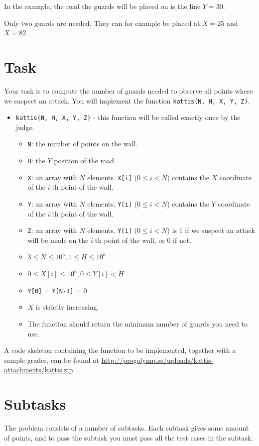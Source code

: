 In the example, the road the guards will be placed on is the line $Y = 30$.

Only two guards are needed. They can for example be placed at $X = 25$ and $X = 82$.

\section*{Task}
Your task is to compute the number of guards needed to observe all points where we suspect an attack. You will implement the function
\texttt{kattis(N, H, X, Y, Z)}.

\begin{itemize}
  \item \texttt{kattis(N, H, X, Y, Z)} - this function will be called exactly once by the judge.
  \begin{itemize}
    \item \texttt{N}: the number of points on the wall.
    \item \texttt{H}: the $Y$ position of the road.
    \item \texttt{X}: an array with $N$ elements. \texttt{X[i]} ($0 \le i < N$) contains the $X$ coordinate of the $i$:th point of the wall.
    \item \texttt{Y}: an array with $N$ elements. \texttt{Y[i]} ($0 \le i < N$) contains the $Y$ coordinate of the $i$:th point of the wall.
    \item \texttt{Z}: an array with $N$ elements. \texttt{Y[i]} ($0 \le i < N$) is 1 if we suspect an attack will be made on the $i$:th point of the wall, or 0 if not.
    \item $3 \le N \le 10^5, 1 \le H \le 10^6$
    \item $0 \le X[i] \le 10^6, 0 \le Y[i] < H$
    \item \texttt{Y[0]} = \texttt{Y[N-1]} = 0
    \item $X$ is strictly increasing.
    \item The function should return the minimum number of guards you need to use.
  \end{itemize}
\end{itemize}

A code skeleton containing the function to be implemented, together with a sample grader, can be found at
\url{http://progolymp.se/uploads/kattis-attachments/kattis.zip}.

\section*{Subtasks}
The problem consists of a number of subtasks. Each subtask gives some amount of points, and to pass
the subtask you must pass all the test cases in the subtask.

